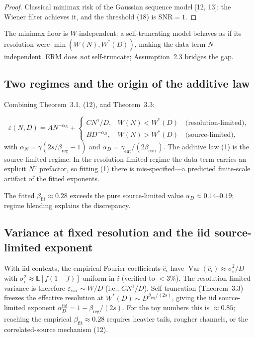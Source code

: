 \documentclass[entropy,article,submit,moreauthors,pdftex]{mdpi}
\newcommand{\eps}{\varepsilon}
\newcommand{\E}{\mathbb{E}}
\newcommand{\Var}{\operatorname{Var}}
\begin{document}
\begin{proof}
Classical minimax risk of the Gaussian sequence model
[12, 13]; the Wiener filter achieves it, and the
threshold (18) is SNR$=1$.
\end{proof}

\begin{remark}
\label{rem:realizability}
The minimax floor is $W$-independent: a self-truncating model behaves as if its
resolution were $\min(W(N),W^*(D))$, making the data term $N$-independent.
ERM does \emph{not} self-truncate; Assumption~2.3 bridges the gap.
\end{remark}

\subsection{Two regimes and the origin of the additive law}
Combining Theorem~3.1, (12), and
Theorem~3.3:

\begin{equation}
  \eps(N,D) = A N^{-\alpha_N}+
  \begin{cases}
    C N^{\gamma}/D, & W(N)<W^*(D)\quad \text{(resolution-limited)}, \\
    B D^{-\alpha_D}, & W(N)>W^*(D)\quad \text{(source-limited)},
  \end{cases}
  \label{eq:regimes}
\end{equation}
with $\alpha_N=\gamma(2s/\beta_{\mathrm{reg}}-1)$ and
$\alpha_D=\gamma_{\mathrm{ent}}/(2\beta_{\mathrm{corr}})$. The additive law
(1) is the source-limited regime. In the resolution-limited regime
the data term carries an explicit $N^\gamma$ prefactor, so fitting
(1) there is mis-specified---a predicted finite-scale artifact of
the fitted exponents.

\begin{remark}
\label{rem:empirical}
The fitted $\beta_{\mathrm{fit}}\approx0.28$ exceeds the pure source-limited value
$\alpha_D\approx0.14$--$0.19$; regime blending explains the discrepancy.
\end{remark}

\subsection{Variance at fixed resolution and the iid source-limited exponent}
With iid contexts, the empirical Fourier coefficients $\hat c_i$ have
$\Var(\hat c_i)\approx\sigma_i^2/D$ with $\sigma_i^2\approx\E[f(1-f)]$
uniform in $i$ (verified to $<3\%$).  The resolution-limited variance is
therefore $\eps_{\mathrm{var}}\sim W/D$ (i.e., $C N^{\gamma}/D$). Self-truncation
(Theorem~3.3) freezes the effective resolution at
$W^*(D)\sim D^{\beta_{\mathrm{reg}}/(2s)}$, giving the iid source-limited exponent
$\alpha_D^{\mathrm{iid}}=1-\beta_{\mathrm{reg}}/(2s)$. For the toy numbers this is
$\approx0.85$; reaching the empirical $\beta_{\mathrm{fit}}\approx0.28$ requires
heavier tails, rougher channels, or the correlated-source mechanism
(12).
\end{document}
